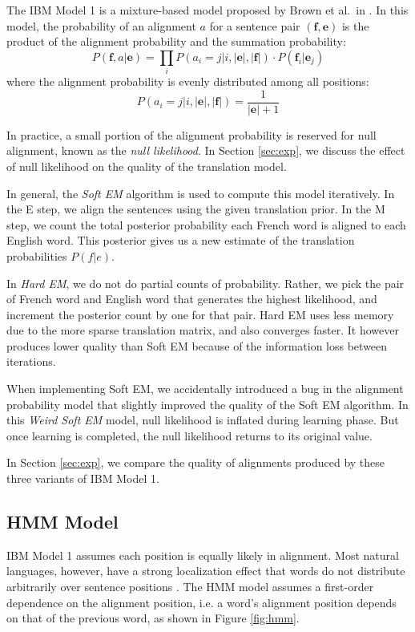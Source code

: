 \documentclass[12pt]{article}   %
\begin{document}
The IBM Model 1 is a mixture-based model proposed by Brown et al.~in \cite{ibm-models}. In this model, the probability of an alignment $a$ for a sentence pair $(\mathbf{f}, \mathbf{e})$ is the product of the alignment probability and the summation probability:
$$ P(\mathbf{f}, a|\mathbf{e}) = \prod_{i} P(a_i = j|i, |\mathbf{e}|, |\mathbf{f}|) \cdot P(\mathbf{f}_i|\mathbf{e}_j) $$
where the alignment probability is evenly distributed among all positions:
$$ P(a_i = j|i, |\mathbf{e}|, |\mathbf{f}|) = \frac{1}{|\mathbf{e}| + 1} $$

In practice, a small portion of the alignment probability is reserved for null alignment, known as the \emph{null likelihood}. In Section \ref{sec:exp}, we discuss the effect of null likelihood on the quality of the translation model.

In general, the \emph{Soft EM} algorithm is used to compute this model iteratively. In the E step, we align the sentences using the given translation prior. In the M step, we count the total posterior probability each French word is aligned to each English word. This posterior gives us a new estimate of the translation probabilities $P(f|e)$.

In \emph{Hard EM}, we do not do partial counts of probability. Rather, we pick the pair of French word and English word that generates the highest likelihood, and increment the posterior count by one for that pair. Hard EM uses less memory due to the more sparse translation matrix, and also converges faster. It however produces lower quality than Soft EM because of the information loss between iterations.

When implementing Soft EM, we accidentally introduced a bug in the alignment probability model that slightly improved the quality of the Soft EM algorithm. In this \emph{Weird Soft EM} model, null likelihood is inflated during learning phase. But once learning is completed, the null likelihood returns to its original value.

In Section \ref{sec:exp}, we compare the quality of alignments produced by these three variants of IBM Model 1.


\subsection{HMM Model}
IBM Model 1 assumes each position is equally likely in alignment. Most natural languages, however, have a strong localization effect that words do not distribute arbitrarily over sentence positions \cite{hmm-model}. The HMM model assumes a first-order dependence on the alignment position, i.e. a word's alignment position depends on that of the previous word, as shown in Figure \ref{fig:hmm}.
\end{document}
